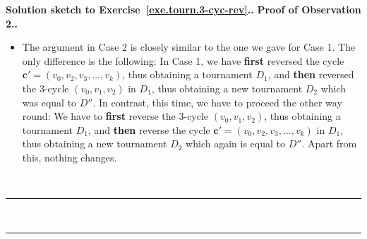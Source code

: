 \documentclass[numbers=enddot,12pt,final,onecolumn,notitlepage]{scrartcl}%
\theoremstyle{definition}
\newenvironment{proof}[1][Proof]{\noindent\textbf{#1.} }{\ \rule{0.5em}{0.5em}}
\newcommand{\tup}[1]{\left( #1 \right)}
\begin{document}
\begin{proof}[Solution sketch to Exercise~\ref{exe.tourn.3-cyc-rev}.]
\begin{proof}[Proof of Observation 2.]
\begin{itemize}
{\begin{itemize}
            $\mathbf{c}' = \tup{v_0, v_2, v_3, \ldots, v_k}$ in $D$.
            This amounts to reversing the arcs
            $\tup{v_0, v_2}, \tup{v_2, v_3}, \tup{v_3, v_4},
            \ldots, \tup{v_{k-1}, v_k}$.
      \item Then, we obtained $D_2$ from $D_1$ by reversing the
            $3$-cycle $\tup{v_0, v_1, v_2}$.
            This amounts to reversing the arcs
            $\tup{v_0, v_1}$, $\tup{v_1, v_2}$ and $\tup{v_2, v_0}$.
      \end{itemize}
      Thus, in total, we have reversed the arcs
      $\tup{v_0, v_2}, \tup{v_2, v_3}, \tup{v_3, v_4},
      \ldots, \tup{v_{k-1}, v_k}$ and then the three arcs
      $\tup{v_0, v_1}, \tup{v_1, v_2}, \tup{v_2, v_0}$
      to obtain $D_2$ from $D$.
      Clearly, the reversal of the arc
      $\tup{v_0, v_2}$ was undone by the (later) reversal of the
      arc $\tup{v_2, v_0}$; therefore, we can forget about these two
      reversals. Hence, $D_2$ is obtained from $D$ by reversing the
      arcs $\tup{v_2, v_3}, \tup{v_3, v_4},
      \ldots, \tup{v_{k-1}, v_k}, \tup{v_0, v_1}, \tup{v_1, v_2}$.
      But this is tantamount to reversing the cycle $\mathbf{c}$
      (since $\mathbf{c} = \tup{v_0, v_1, v_2, \ldots, v_k}$).
      Hence, $D_2$ is obtained from $D$ by reversing the cycle
      $\mathbf{c}$. But $D''$ is obtained from $D$ in exactly the same
      way (i.e., by reversing the cycle $\mathbf{c}$). Hence,
      $D_2 = D''$.}.
      But we know that $D_2$ is obtained from $D$ by a sequence of
      $3$-cycle reversal operations.
      In other words, $D''$ is obtained from $D$ by a sequence of
      $3$-cycle reversal operations. This proves what we wanted
      to prove in Case 1.
\item The argument in Case 2 is closely similar to the one we gave for
      Case 1. The only difference is the following: In Case 1, we have
      \textbf{first} reversed the cycle
      $\mathbf{c}' = \tup{v_0, v_2, v_3, \ldots, v_k}$, thus obtaining
      a tournament $D_1$, and
      \textbf{then} reversed the $3$-cycle $\tup{v_0, v_1, v_2}$ in
      $D_1$, thus obtaining a new tournament $D_2$ which was equal to
      $D''$. In contrast, this time, we have to proceed the other way
      round: We have to
      \textbf{first} reverse the $3$-cycle $\tup{v_0, v_1, v_2}$,
      thus obtaining a tournament $D_1$, and
      \textbf{then} reverse the cycle
      $\mathbf{c}' = \tup{v_0, v_2, v_3, \ldots, v_k}$ in $D_1$, thus
      obtaining a new tournament $D_2$ which again is equal to $D''$.
      Apart from this, nothing changes.
\end{itemize}


\end{proof}
\end{proof}
\end{document}
